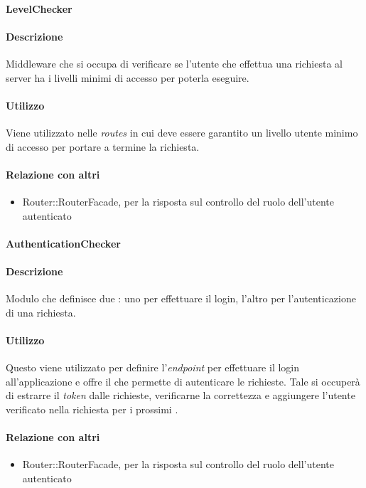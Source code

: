 \paragraph{LevelChecker}
\paragraph*{Descrizione}
Middleware che si occupa di verificare se l'utente che effettua una richiesta al server ha i livelli minimi di accesso per poterla eseguire.

\paragraph*{Utilizzo}
Viene utilizzato nelle \textit{routes} in cui deve essere garantito un livello utente minimo di accesso per portare a termine la richiesta.

\paragraph*{Relazione con altri }
\begin{itemize}
\item Router::RouterFacade, per la risposta sul controllo del ruolo dell'utente autenticato
\end{itemize}

\paragraph{AuthenticationChecker}
\paragraph*{Descrizione}
Modulo che definisce due : uno per effettuare il login, l'altro per l'autenticazione di una richiesta.

\paragraph*{Utilizzo}
Questo  viene utilizzato per definire l'\textit{endpoint} per effettuare il login all'applicazione e offre il  che permette di autenticare le richieste. Tale  si occuperà di estrarre il \textit{token} dalle richieste, verificarne la correttezza e aggiungere l'utente verificato nella richiesta per i prossimi .

\paragraph*{Relazione con altri }
\begin{itemize}
\item Router::RouterFacade, per la risposta sul controllo del ruolo dell'utente autenticato
\end{itemize}


